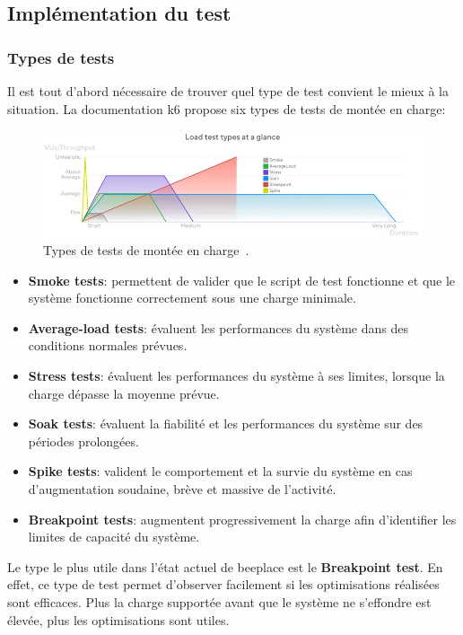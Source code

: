 \subsection{Implémentation du test}

\subsubsection{Types de tests}

Il est tout d'abord nécessaire de trouver quel type de test convient le mieux à la situation. La documentation k6 propose six types de tests de montée en charge:

\begin{figure}[H]
  \centering
  \includegraphics[width=1\textwidth]{./assets/figures/load-test-types.png}
  \caption{Types de tests de montée en charge~\cite{k6-load-test-types}.}
  \label{fig:load-test-types}
\end{figure}

\begin{itemize}
  \item \textbf{Smoke tests}: permettent de valider que le script de test fonctionne et que le système fonctionne correctement sous une charge minimale.
  \item \textbf{Average-load tests}: évaluent les performances du système dans des conditions normales prévues.
  \item \textbf{Stress tests}: évaluent les performances du système à ses limites, lorsque la charge dépasse la moyenne prévue.
  \item \textbf{Soak tests}: évaluent la fiabilité et les performances du système sur des périodes prolongées.
  \item  \textbf{Spike tests}: valident le comportement et la survie du système en cas d'augmentation soudaine, brève et massive de l'activité.
  \item \textbf{Breakpoint tests}: augmentent progressivement la charge afin d'identifier les limites de capacité du système.
\end{itemize}

Le type le plus utile dans l'état actuel de \gls{beeplace} est le \textbf{Breakpoint test}. En effet, ce type de test permet d'observer facilement si les optimisations réalisées sont efficaces. Plus la charge supportée avant que le système ne s'effondre est élevée, plus les optimisations sont utiles.

